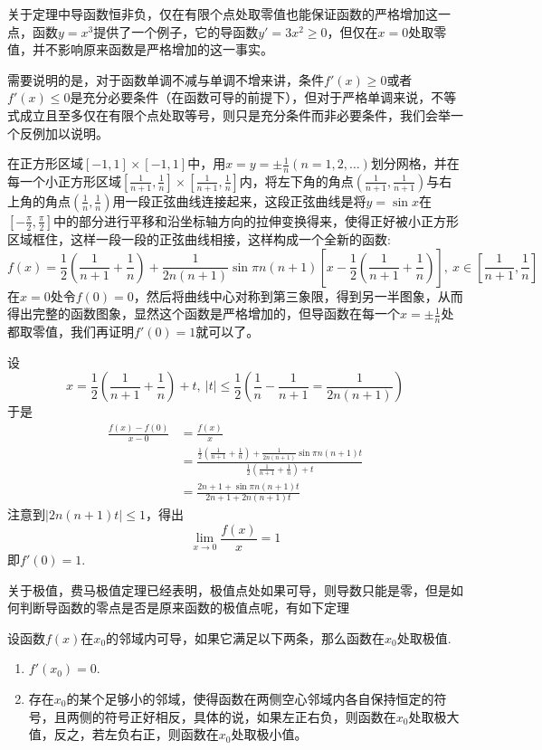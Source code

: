 \begin{example}
  关于定理中导函数恒非负，仅在有限个点处取零值也能保证函数的严格增加这一点，函数$y=x^3$提供了一个例子，它的导函数$y'=3x^2 \geqslant 0$，但仅在$x=0$处取零值，并不影响原来函数是严格增加的这一事实。
\end{example}

\begin{example}
需要说明的是，对于函数单调不减与单调不增来讲，条件$f'(x) \geqslant 0$或者$f'(x) \leqslant 0$是充分必要条件（在函数可导的前提下），但对于严格单调来说，不等式成立且至多仅在有限个点处取等号，则只是充分条件而非必要条件，我们会举一个反例加以说明。

在正方形区域$[-1,1]\times[-1,1]$中，用$x=y=\pm \frac{1}{n}(n=1,2,\ldots)$划分网格，并在每一个小正方形区域$[\frac{1}{n+1},\frac{1}{n}] \times [\frac{1}{n+1},\frac{1}{n}]$内，将左下角的角点$\left(\frac{1}{n+1},\frac{1}{n+1}\right)$与右上角的角点$\left(\frac{1}{n},\frac{1}{n}\right)$用一段正弦曲线连接起来，这段正弦曲线是将$y=\sin{x}$在$\left[ -\frac{\pi}{2}, \frac{\pi}{2} \right]$中的部分进行平移和沿坐标轴方向的拉伸变换得来，使得正好被小正方形区域框住，这样一段一段的正弦曲线相接，这样构成一个全新的函数:
\[ f(x) = \frac{1}{2} \left( \frac{1}{n+1} + \frac{1}{n} \right) + \frac{1}{2n(n+1)} \sin{\pi n(n+1) \left[ x - \frac{1}{2} \left( \frac{1}{n+1} + \frac{1}{n} \right) \right]}, \  x \in \left[ \frac{1}{n+1}, \frac{1}{n} \right] \]
在$x=0$处令$f(0)=0$，然后将曲线中心对称到第三象限，得到另一半图象，从而得出完整的函数图象，显然这个函数是严格增加的，但导函数在每一个$x = \pm \frac{1}{n}$处都取零值，我们再证明$f'(0)=1$就可以了。

设
\[ x = \frac{1}{2} \left( \frac{1}{n+1} + \frac{1}{n} \right) +t, \  |t| \leqslant \frac{1}{2}\left( \frac{1}{n} - \frac{1}{n+1} = \frac{1}{2n(n+1)} \right) \]
于是
\begin{align*}
  \frac{f(x)-f(0)}{x-0} & = \frac{f(x)}{x} \\
                        & = \frac{\frac{1}{2} \left( \frac{1}{n+1} + \frac{1}{n} \right)+\frac{1}{2n(n+1)}\sin{\pi n(n+1)t}}{\frac{1}{2} \left( \frac{1}{n+1} + \frac{1}{n} \right)+t} \\
  & = \frac{2n+1+\sin{\pi n(n+1)t}}{2n+1+2n(n+1)t}
\end{align*}
注意到$|2n(n+1)t| \leqslant 1$，得出
\[ \lim_{x \to 0} \frac{f(x)}{x} = 1 \]
即$f'(0)=1$.
\end{example}


关于极值，费马极值定理已经表明，极值点处如果可导，则导数只能是零，但是如何判断导函数的零点是否是原来函数的极值点呢，有如下定理
\begin{theorem}
  设函数$f(x)$在$x_0$的邻域内可导，如果它满足以下两条，那么函数在$x_0$处取极值.
  \begin{enumerate}
  \item $f'(x_0)=0$.
  \item 存在$x_0$的某个足够小的邻域，使得函数在两侧空心邻域内各自保持恒定的符号，且两侧的符号正好相反，具体的说，如果左正右负，则函数在$x_0$处取极大值，反之，若左负右正，则函数在$x_0$处取极小值。
  \end{enumerate}
\end{theorem}

